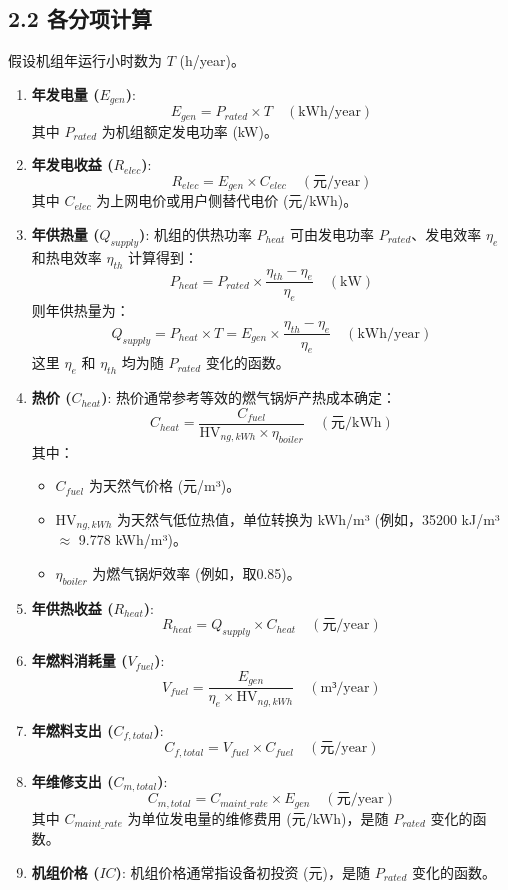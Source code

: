 \documentclass[12pt]{ctexart}
\begin{document}
\subsection{2.2 各分项计算}
假设机组年运行小时数为 $T$ (h/year)。
\begin{enumerate}
    \item \textbf{年发电量 ($E_{gen}$)}:
    \[ E_{gen} = P_{rated} \times T \quad (\text{kWh/year}) \]
    其中 $P_{rated}$ 为机组额定发电功率 (kW)。

    \item \textbf{年发电收益 ($R_{elec}$)}:
    \[ R_{elec} = E_{gen} \times C_{elec} \quad (\text{元/year}) \]
    其中 $C_{elec}$ 为上网电价或用户侧替代电价 (元/kWh)。

    \item \textbf{年供热量 ($Q_{supply}$)}:
    机组的供热功率 $P_{heat}$ 可由发电功率 $P_{rated}$、发电效率 $\eta_e$ 和热电效率 $\eta_{th}$ 计算得到：
    \[ P_{heat} = P_{rated} \times \frac{\eta_{th} - \eta_e}{\eta_e} \quad (\text{kW}) \]
    则年供热量为：
    \[ Q_{supply} = P_{heat} \times T = E_{gen} \times \frac{\eta_{th} - \eta_e}{\eta_e} \quad (\text{kWh/year}) \]
    这里 $\eta_e$ 和 $\eta_{th}$ 均为随 $P_{rated}$ 变化的函数。

    \item \textbf{热价 ($C_{heat}$)}:
    热价通常参考等效的燃气锅炉产热成本确定：
    \[ C_{heat} = \frac{C_{fuel}}{\text{HV}_{ng, kWh} \times \eta_{boiler}} \quad (\text{元/kWh}) \]
    其中：
    \begin{itemize}
        \item $C_{fuel}$ 为天然气价格 (元/m³)。
        \item $\text{HV}_{ng, kWh}$ 为天然气低位热值，单位转换为 kWh/m³ (例如，35200 kJ/m³ $\approx$ 9.778 kWh/m³)。
        \item $\eta_{boiler}$ 为燃气锅炉效率 (例如，取0.85)。
    \end{itemize}

    \item \textbf{年供热收益 ($R_{heat}$)}:
    \[ R_{heat} = Q_{supply} \times C_{heat} \quad (\text{元/year}) \]

    \item \textbf{年燃料消耗量 ($V_{fuel}$)}:
    \[ V_{fuel} = \frac{E_{gen}}{\eta_e \times \text{HV}_{ng, kWh}} \quad (\text{m³/year}) \]

    \item \textbf{年燃料支出 ($C_{f,total}$)}:
    \[ C_{f,total} = V_{fuel} \times C_{fuel} \quad (\text{元/year}) \]

    \item \textbf{年维修支出 ($C_{m,total}$)}:
    \[ C_{m,total} = C_{maint\_rate} \times E_{gen} \quad (\text{元/year}) \]
    其中 $C_{maint\_rate}$ 为单位发电量的维修费用 (元/kWh)，是随 $P_{rated}$ 变化的函数。

    \item \textbf{机组价格 ($IC$)}:
    机组价格通常指设备初投资 (元)，是随 $P_{rated}$ 变化的函数。
\end{enumerate}
\end{document}
